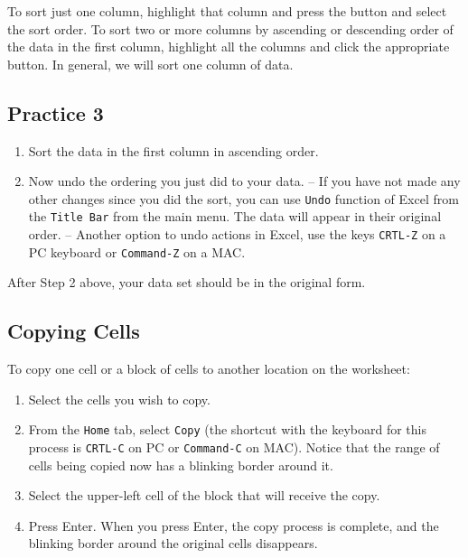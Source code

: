 \documentclass[
  12pt,
  letterpaper,
]{book}
\providecommand{\tightlist}{%
  \setlength{\itemsep}{0pt}\setlength{\parskip}{0pt}}
\begin{document}
To sort just one column, highlight that column and press the button and select the sort order. To sort two or more columns by ascending or descending order of the data in the first column, highlight all the columns and click the appropriate button. In general, we will sort one column of data.

\hypertarget{practice-3}{%
\subsection{Practice 3}\label{practice-3}}

\begin{enumerate}
\def\labelenumi{\arabic{enumi}.}
\tightlist
\item
  Sort the data in the first column in ascending order.
\item
  Now undo the ordering you just did to your data.
  -- If you have not made any other changes since you did the sort, you can use \texttt{Undo} function of Excel from the \texttt{Title\ Bar} from the main menu. The data will appear in their original order.
  -- Another option to undo actions in Excel, use the keys \texttt{CRTL-Z} on a PC keyboard or \texttt{Command-Z} on a MAC.
\end{enumerate}

After Step 2 above, your data set should be in the original form.

\hypertarget{copying-cells}{%
\subsection{Copying Cells}\label{copying-cells}}

To copy one cell or a block of cells to another location on the worksheet:

\begin{enumerate}
\def\labelenumi{\arabic{enumi}.}
\tightlist
\item
  Select the cells you wish to copy.
\item
  From the \texttt{Home} tab, select \texttt{Copy} (the shortcut with the keyboard for this process is \texttt{CRTL-C} on PC or \texttt{Command-C} on MAC). Notice that the range of cells being copied now has a blinking border around it.
\item
  Select the upper-left cell of the block that will receive the copy.
\item
  Press Enter. When you press Enter, the copy process is complete, and the blinking border around the original cells disappears.
\end{enumerate}
\end{document}
